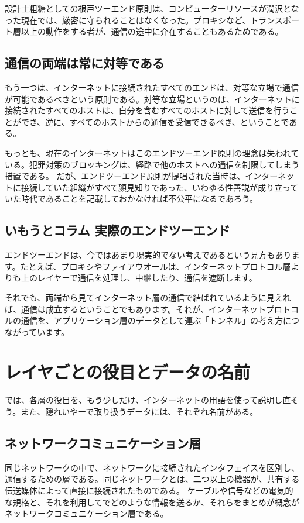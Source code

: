 設計士粗糖としての根戸ツーエンド原則は、コンピューターリソースが潤沢となった現在では、厳密に守られることはなくなった。プロキシなど、トランスポート層以上の動作をする者が、通信の途中に介在することもあるためである。

\subsection{通信の両端は常に対等である}

もう一つは、インターネットに接続されたすべてのエンドは、対等な立場で通信が可能であるべきという原則である。対等な立場というのは、インターネットに接続されたすべてのホストは、自分を含むすべてのホストに対して送信を行うことができ、逆に、すべてのホストからの通信を受信できるべき、ということである。

もっとも、現在のインターネットはこのエンドツーエンド原則の理念は失われている。犯罪対策のブロッキングは、経路で他のホストへの通信を制限してしまう措置である。
だが、エンドツーエンド原則が提唱された当時は、インターネットに接続していた組織がすべて顔見知りであった、いわゆる性善説が成り立っていた時代であることを記載しておかなければ不公平になるであろう。

\subsection*{いもうとコラム 実際のエンドツーエンド}
エンドツーエンドは、今ではあまり現実的でない考えであるという見方もあります。たとえば、プロキシやファイアウオールは、インターネットプロトコル層よりも上のレイヤーで通信を処理し、中継したり、通信を遮断します。

それでも、両端から見てインターネット層の通信で結ばれているように見えれば、通信は成立するということでもあります。それが、インターネットプロトコルの通信を、アプリケーション層のデータとして運ぶ「トンネル」の考え方につながっています。


\section{レイヤごとの役目とデータの名前}
では、各層の役目を、もう少しだけ、インターネットの用語を使って説明し直そう。また、隠れいやーで取り扱うデータには、それぞれ名前がある。

\subsection{ネットワークコミュニケーション層}
同じネットワークの中で、ネットワークに接続されたインタフェイスを区別し、通信するための層である。同じネットワークとは、二つ以上の機器が、共有する伝送媒体によって直接に接続されたものである。
ケーブルや信号などの電気的な規格と、それを利用してでどのような情報を送るか、それらをまとめが概念がネットワークコミュニケーション層である。

